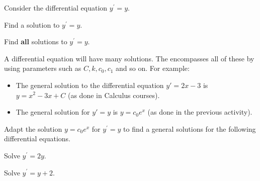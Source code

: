 \begin{applicationActivities}
\begin{activity}{15}
Consider the differential equation \(y^\prime=y\).
\begin{subactivity}
Find a solution to \(y^{\prime}=y\).
\end{subactivity}
\begin{subactivity}
Find {\bf all} solutions to \(y^{\prime}=y\).
\end{subactivity}
\end{activity}

\begin{definition}
A differential equation will have many solutions.  The  encompasses all of these by using 
parameters such as \(C,k,c_0,c_1\) and so on. For example:

\begin{itemize}
\item The general solution to the differential equation \(y'=2x-3\) is \(y=x^2-3x+C\) (as done in
Calculus courses).
\item The general solution for \(y'=y\) is \(y=c_0 e^x\) (as done in the previous activity). 
\end{itemize}

\end{definition}


\begin{activity}{15}
Adapt the solution \(y=c_0e^x\) for \(y^\prime=y\) to find a general solutions for
the following differential equations.
\begin{subactivity}
Solve \(y^{\prime}=2y\).
\end{subactivity}
\begin{subactivity}
Solve \(y^{\prime}=y+2\).
\end{subactivity}
\end{activity}

\end{applicationActivities}
